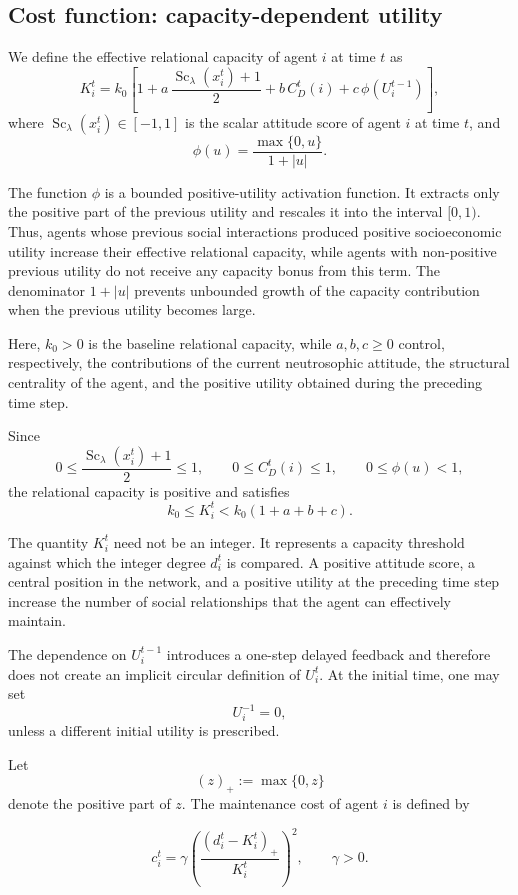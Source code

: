 \documentclass[11pt,a4paper]{article}
\newcommand{\Sc}{\operatorname{Sc}}
\begin{document}
\subsection{Cost function: capacity-dependent utility}
We define the effective relational capacity of agent $i$ at time $t$ as
\[
K_i^t
=
k_0
\left[
1
+
a\,\frac{\Sc_\lambda(x_i^t)+1}{2}
+
b\,C_D^t(i)
+
c\,\phi(U_i^{t-1})
\right],
\]
where $\Sc_\lambda(x_i^t)\in[-1,1]$ is the scalar attitude score of agent $i$ at time $t$, and
\[
\phi(u)=\frac{\max\{0,u\}}{1+|u|}.
\]

The function $\phi$ is a bounded positive-utility activation function. It extracts only the
positive part of the previous utility and rescales it into the interval $[0,1)$. Thus, agents
whose previous social interactions produced positive socioeconomic utility increase their
effective relational capacity, while agents with non-positive previous utility do not receive
any capacity bonus from this term. The denominator $1+|u|$ prevents unbounded growth of
the capacity contribution when the previous utility becomes large.

Here, $k_0>0$ is the baseline relational capacity, while $a,b,c\geq 0$ control, respectively,
the contributions of the current neutrosophic attitude, the structural centrality of the agent,
and the positive utility obtained during the preceding time step.

Since
\[
0\leq \frac{\Sc_\lambda(x_i^t)+1}{2}\leq 1,
\qquad
0\leq C_D^t(i)\leq 1,
\qquad
0\leq \phi(u)<1,
\]
the relational capacity is positive and satisfies
\[
k_0\leq K_i^t<k_0(1+a+b+c).
\]

	The quantity $K_i^t$ need not be an integer. It represents a
	capacity threshold against which the integer degree $d_i^t$ is
	compared. A positive attitude score, a central position in the
	network, and a positive utility at the preceding time step increase the number of social relationships that the agent can effectively maintain.
	
	The dependence on $U_i^{t-1}$ introduces a one-step delayed feedback and therefore does not create an implicit circular definition of $U_i^t$. At the initial time, one may set
	$$
	U_i^{-1} = 0,
	$$
	unless a different initial utility is prescribed.
	
	Let
	$$
	(z)_+ := \max\{0,z\}
	$$
	denote the positive part of $z$. The maintenance cost of agent $i$ is defined by
	
	$$
	c_i^t = \gamma\left( \frac{(d_i^t-K_i^t)_+}{K_i^t} \right)^2, 
	\qquad
	\gamma > 0.
	$$
	
\end{document}
